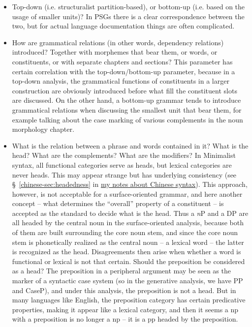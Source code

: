 \documentclass{article}
\newcommand*{\citesec}[1]{\S~{#1}}
\newcommand*{\term}[1]{\emph{#1}}
\newcommand{\chinese}{\href{../Chinese/main.pdf}{my notes about Chinese syntax}}
\begin{document}
\begin{itemize}
    \item Top-down (i.e. structuralist partition-based), 
    or bottom-up (i.e. based on the usage of smaller units)? 
    In PSGs there is a clear correspondence between the two, 
    but for actual language documentation things are often complicated.

    \item How are grammatical relations (in other words, dependency relations) introduced? 
    Together with morphemes that bear them, or words, or constituents, or with separate chapters and sections?
    This parameter has certain correlation with the top-down/bottom-up parameter,
    because in a top-down analysis,
    the grammatical functions of constituents in a larger construction 
    are obviously introduced before what fill the constituent slots are discussed.
    On the other hand, 
    a bottom-up grammar tends to introduce grammatical relations when discussing the smallest unit that bear them,
    for example talking about the case marking of various complements in the noun morphology chapter.

    \item What is the relation between a phrase and words contained in it?
    What is the head? What are the complements? What are the modifiers?
    In Minimalist syntax, all functional categories serve as heads,
    but lexical categories are never heads.
    This may appear strange but has underlying consistency 
    (see \citesec{\ref{chinese-sec:headedness}} in \chinese).
    This approach, however, is not acceptable for a surface-oriented grammar,
    and here another concept -- what determines the ``overall'' property of a constituent -- 
    is accepted as the standard to decide what is the head. 
    Thus a \term{n}P and a DP are all headed by the central noun in the surface-oriented analysis,
    because both of them are built surrounding the core noun stem,
    and since the core noun stem is phonetically realized as the central noun -- a lexical word --
    the latter is recognized as the head.
    Disagreements then arise when whether a word is functional or lexical is not that certain.
    Should the preposition be considered as a head? 
    The preposition in a peripheral argument may be seen as the marker of a syntactic case system 
    (so in the generative analysis, we have PP and CaseP),
    and under this analysis, the preposition is not a head.
    But in many languages like English, 
    the preposition category has certain predicative properties,
    making it appear like a lexical category, 
    and then it seems a \ac{np} with a preposition is no longer a \ac{np} -- 
    it is a \ac{pp} headed by the preposition.
    

\end{itemize}
\end{document}
